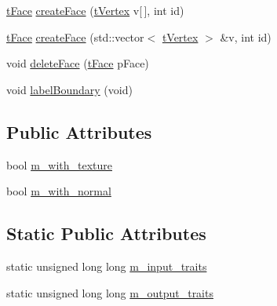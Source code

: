 \begin{DoxyCompactItemize}
\item 
\hyperlink{class_mesh_lib_1_1_c_base_mesh_ad231546551e85dffb41c9aa9bcf5b86b}{t\+Face} \hyperlink{class_mesh_lib_1_1_c_base_mesh_a5c1a9a5b45a58d766a664595f8c799b1}{create\+Face} (\hyperlink{class_mesh_lib_1_1_c_base_mesh_adcf412e8267910b50f3145d6416947da}{t\+Vertex} v\mbox{[}$\,$\mbox{]}, int id)
\item 
\hyperlink{class_mesh_lib_1_1_c_base_mesh_ad231546551e85dffb41c9aa9bcf5b86b}{t\+Face} \hyperlink{class_mesh_lib_1_1_c_base_mesh_a2ae791035daa07ac116913aa6866e990}{create\+Face} (std\+::vector$<$ \hyperlink{class_mesh_lib_1_1_c_base_mesh_adcf412e8267910b50f3145d6416947da}{t\+Vertex} $>$ \&v, int id)
\item 
void \hyperlink{class_mesh_lib_1_1_c_base_mesh_a1a037d32457d70216d0885c31a2d889a}{delete\+Face} (\hyperlink{class_mesh_lib_1_1_c_base_mesh_ad231546551e85dffb41c9aa9bcf5b86b}{t\+Face} p\+Face)
\item 
void \hyperlink{class_mesh_lib_1_1_c_base_mesh_a7f7c5053e7254f0b3a9ed4869848885f}{label\+Boundary} (void)
\end{DoxyCompactItemize}
\subsection*{Public Attributes}
\begin{DoxyCompactItemize}
\item 
bool \hyperlink{class_mesh_lib_1_1_c_base_mesh_a36ba9fb8f3b289de348f1133ee6ab4bb}{m\+\_\+with\+\_\+texture}
\item 
bool \hyperlink{class_mesh_lib_1_1_c_base_mesh_a105ddccad80953028cc54cd317dee8a4}{m\+\_\+with\+\_\+normal}
\end{DoxyCompactItemize}
\subsection*{Static Public Attributes}
\begin{DoxyCompactItemize}
\item 
static unsigned long long \hyperlink{class_mesh_lib_1_1_c_base_mesh_a09dbf8905e5b0dbe3c8353070f83ae81}{m\+\_\+input\+\_\+traits}
\item 
static unsigned long long \hyperlink{class_mesh_lib_1_1_c_base_mesh_af1a7720a0b51675ac91cc8c00d1959a3}{m\+\_\+output\+\_\+traits}
\end{DoxyCompactItemize}
